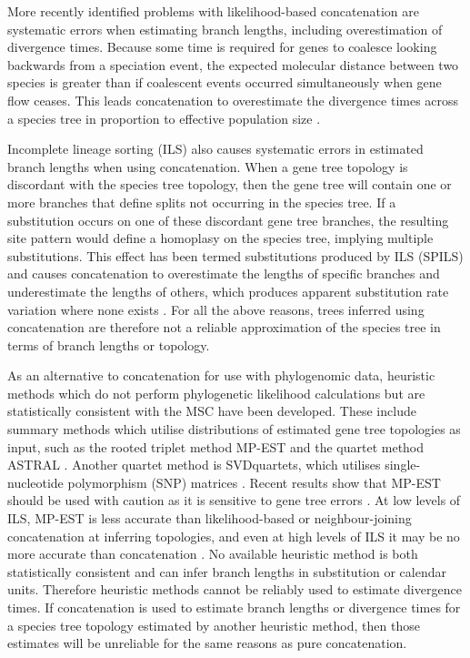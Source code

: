 \documentclass[nogrid]{MBE}%
\begin{document}
More recently identified problems with likelihood-based concatenation are
systematic errors when estimating branch lengths, including overestimation of
divergence times. Because some time is required for genes to coalesce
looking backwards from a speciation event, the expected molecular distance
between two species is greater than if coalescent events occurred
simultaneously when
gene flow ceases. This leads concatenation to overestimate the divergence
times across a species tree in proportion to effective population size
\citep{doi:10.1146/annurev.ecolsys.33.010802.150500, Ogilvie01052016}.

Incomplete lineage sorting (ILS) also causes systematic errors in estimated
branch lengths when using concatenation. When a gene tree topology is
discordant with the species tree topology, 
then the gene tree will contain one or more branches that define splits not occurring in the species tree.
If a substitution occurs on one of these discordant gene tree
branches, the resulting site pattern would define a homoplasy on the species tree, implying multiple substitutions. 
This effect has been termed substitutions
produced by ILS (SPILS) and causes concatenation to overestimate the lengths
of specific branches and underestimate the lengths of others, which produces
apparent substitution rate variation where none exists \citep{Mendes01072016}.
For all the above reasons, trees inferred using concatenation are therefore
not a reliable approximation of the species tree in terms of branch lengths or
topology.

As an alternative to concatenation for use with phylogenomic data, heuristic
methods which do not perform phylogenetic likelihood calculations but are statistically
consistent with the MSC have been developed. These include summary methods
which utilise distributions of estimated gene tree topologies as input, such as the
rooted triplet method MP-EST \citep{Liu2010} and the quartet method ASTRAL
\citep{Mirarab01092014}. Another quartet method is SVDquartets, which
utilises single-nucleotide polymorphism (SNP) matrices
\citep{doi:10.1093/bioinformatics/btu530}. Recent results show that MP-EST
should be used with caution as it is sensitive to gene tree errors
\citep{Mirarab15062015, Xi201563}. At low levels of ILS, MP-EST is less
accurate than likelihood-based or neighbour-joining concatenation at inferring
topologies, and even at high levels of ILS it may be no more accurate than
concatenation \citep{Ogilvie01052016}. No available
heuristic method is both statistically consistent and can infer branch lengths in substitution or calendar units. Therefore heuristic methods cannot be reliably used to estimate divergence
times. If concatenation is used to estimate branch lengths or divergence times
for a species tree topology estimated by another heuristic method,
then those estimates will be unreliable for the same reasons as pure
concatenation.
\end{document}
